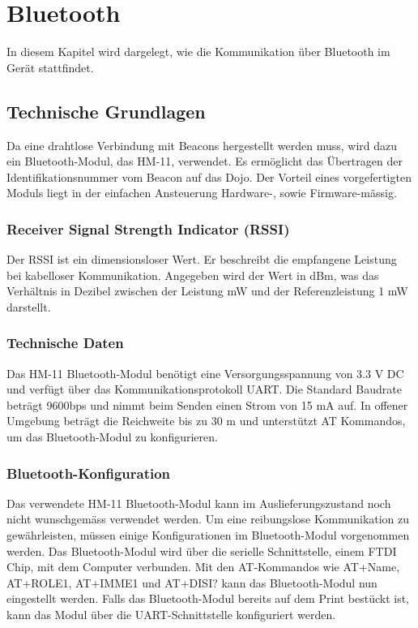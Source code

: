 \chapter{Bluetooth}
\label{Bluetooth}
\thispagestyle{fancy} 
In diesem Kapitel wird dargelegt, wie die Kommunikation über Bluetooth im Gerät stattfindet.

\section{Technische Grundlagen}
Da eine drahtlose Verbindung mit Beacons hergestellt werden muss, wird dazu ein Bluetooth-Modul, das HM-11, verwendet. Es ermöglicht das Übertragen der Identifikationsnummer vom Beacon auf das Dojo. Der Vorteil eines vorgefertigten Moduls liegt in der einfachen Ansteuerung Hardware-, sowie Firmware-mässig.

\subsection*{Receiver Signal Strength Indicator (RSSI)}
Der RSSI ist ein dimensionsloser Wert. Er beschreibt die empfangene Leistung bei kabelloser Kommunikation. Angegeben wird der Wert in dBm, was das Verhältnis in Dezibel zwischen der Leistung mW und der Referenzleistung 1 mW darstellt.

\subsection*{Technische Daten}
Das HM-11 Bluetooth-Modul benötigt eine Versorgungsspannung von 3.3 V DC und verfügt über das Kommunikationsprotokoll UART. Die Standard Baudrate beträgt 9600bps und nimmt beim Senden einen Strom von 15 mA auf. In offener Umgebung beträgt die Reichweite bis zu 30 m und unterstützt AT Kommandos, um das Bluetooth-Modul zu konfigurieren. 

\subsection*{Bluetooth-Konfiguration}
Das verwendete HM-11 Bluetooth-Modul kann im Auslieferungszustand noch nicht wunschgemäss verwendet werden. Um eine reibungslose Kommunikation zu gewährleisten, müssen einige Konfigurationen im Bluetooth-Modul vorgenommen werden. Das Bluetooth-Modul wird über die serielle Schnittstelle, einem FTDI Chip, mit dem Computer verbunden. Mit den AT-Kommandos wie AT+Name, AT+ROLE1, AT+IMME1 und AT+DISI? kann das Bluetooth-Modul nun eingestellt werden. Falls das Bluetooth-Modul bereits auf dem Print bestückt ist, kann das Modul über die UART-Schnittstelle konfiguriert werden. 

